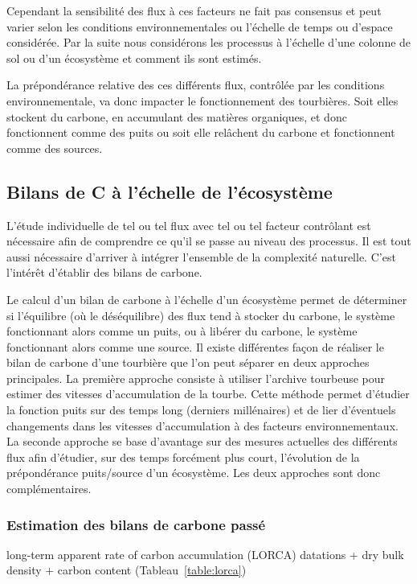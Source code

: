 Cependant la sensibilité des flux à ces facteurs ne fait pas consensus et peut varier selon les conditions environnementales ou l'échelle de temps ou d'espace considérée.
Par la suite nous considérons les processus à l'échelle d'une colonne de sol ou d'un écosystème et comment ils sont estimés.

La prépondérance relative des ces différents flux, contrôlée par les conditions environnementale, va donc impacter le fonctionnement des tourbières. 
Soit elles stockent du carbone, en accumulant des matières organiques, et donc fonctionnent comme des puits ou soit elle relâchent du carbone et fonctionnent comme des sources.


\subsection{Bilans de C à l'échelle de l'écosystème}

L'étude individuelle de tel ou tel flux avec tel ou tel facteur contrôlant est nécessaire afin de comprendre ce qu'il se passe au niveau des processus.
Il est tout aussi nécessaire d'arriver à intégrer l'ensemble de la complexité naturelle.
C'est l'intérêt d'établir des bilans de carbone.

Le calcul d'un bilan de carbone à l'échelle d'un écosystème permet de déterminer si l'équilibre (où le déséquilibre) des flux tend à stocker du carbone, le système fonctionnant alors comme un puits, ou à libérer du carbone, le système fonctionnant alors comme une source.
Il existe différentes façon de réaliser le bilan de carbone d'une tourbière que l'on peut séparer en deux approches principales.
La première approche consiste à utiliser l'archive tourbeuse pour estimer des vitesses d'accumulation de la tourbe.
Cette méthode permet d'étudier la fonction puits sur des temps long (derniers millénaires) et de lier d'éventuels changements dans les vitesses d'accumulation à des facteurs environnementaux.
La seconde approche se base d'avantage sur des mesures actuelles des différents flux afin d'étudier, sur des temps forcément plus court, l'évolution de la prépondérance puits/source d'un écosystème.
Les deux approches sont donc complémentaires.

\subsubsection{Estimation des bilans de carbone passé}

long-term apparent rate of carbon accumulation (LORCA) 
datations + dry bulk density + carbon content
(Tableau~\ref{table:lorca})

